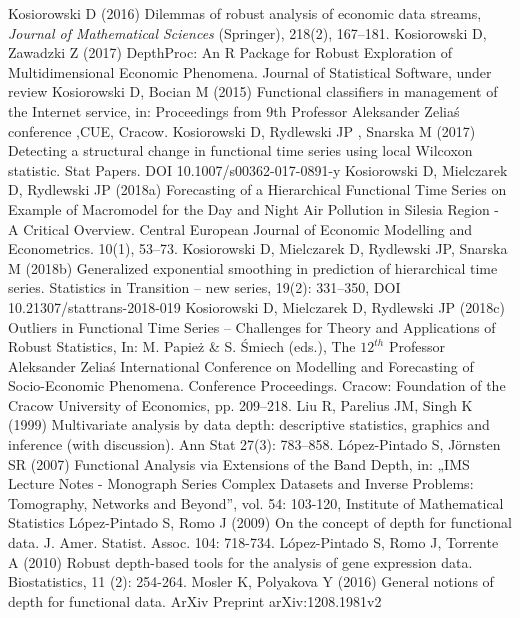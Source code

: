 \documentclass[12pt,a4paper]{article}
\numberwithin{equation}{section}
\begin{document}
\begin{thebibliography}{}
 Kosiorowski D (2016) Dilemmas of robust analysis of economic data streams, \textit{Journal of Mathematical Sciences} (Springer), 218(2), 167--181.
 Kosiorowski D, Zawadzki Z (2017) DepthProc: An R Package for Robust Exploration of Multidimensional Economic Phenomena. Journal of Statistical Software, under review
 Kosiorowski D, Bocian M (2015) Functional classifiers in management of the Internet service, in: Proceedings from 9th Professor Aleksander Zelia\'s conference ,CUE, Cracow.
 Kosiorowski D, Rydlewski JP , Snarska M (2017) Detecting a structural change in functional time series using local Wilcoxon statistic. Stat Papers. DOI 10.1007/s00362-017-0891-y
 Kosiorowski D, Mielczarek D, Rydlewski JP (2018a) Forecasting of a Hierarchical Functional Time Series on Example of Macromodel for the Day and Night Air Pollution in Silesia Region - A Critical Overview. Central European Journal of Economic Modelling and Econometrics. 10(1), 53--73.
 Kosiorowski D, Mielczarek D, Rydlewski JP, Snarska M (2018b) Generalized exponential smoothing in prediction of hierarchical time series. Statistics in Transition -- new series, 19(2): 331--350, DOI 10.21307/stattrans-2018-019
Kosiorowski D, Mielczarek D, Rydlewski JP (2018c) Outliers in Functional Time Series -- Challenges for Theory and
Applications of Robust Statistics, In: M. Papie\.z \& S. \'Smiech (eds.), The $12^{th}$ Professor Aleksander Zelia\'s International Conference on Modelling and Forecasting of Socio-Economic Phenomena. Conference  Proceedings. Cracow: Foundation  of  the  Cracow 
University of Economics, pp. 209--218.
 Liu R, Parelius JM, Singh K (1999) Multivariate analysis by data depth: descriptive statistics, graphics and inference (with discussion). Ann Stat 27(3): 783--858.
 L\'opez-Pintado S, J\"ornsten SR (2007) Functional Analysis via Extensions of the Band Depth, in: „IMS Lecture Notes - Monograph Series Complex Datasets and Inverse Problems: Tomography, Networks and Beyond”, vol. 54: 103-120, Institute of Mathematical Statistics
 L\'opez-Pintado S, Romo J (2009) On the concept of depth for functional data. J. Amer. Statist. Assoc. 104: 718-734.
 L\'opez-Pintado S, Romo J, Torrente A (2010) Robust depth-based tools for the analysis of gene expression data. Biostatistics, 11 (2): 254-264.
 Mosler K, Polyakova Y (2016) General notions of depth for functional data. ArXiv Preprint arXiv:1208.1981v2

\end{thebibliography}
\end{document}
